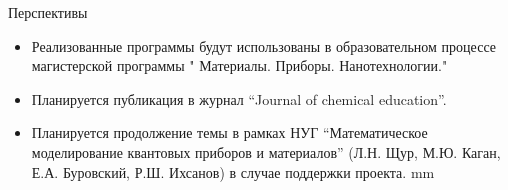 \documentclass{beamer}
\begin{document}
\begin{frame}{Перспективы}
 \begin{itemize}
    		\item Реализованные программы будут использованы в образовательном процессе магистерской программы " Материалы. Приборы. Нанотехнологии."
    		\item Планируется публикация в журнал “Journal of chemical education”.
    		\item Планируется продолжение темы в рамках НУГ “Математическое моделирование квантовых приборов и материалов” (Л.Н. Щур, М.Ю. Каган, Е.А. Буровский, Р.Ш. Ихсанов) в случае поддержки проекта.
    		 mm
   \end{itemize}
\end{frame}



\end{document}
